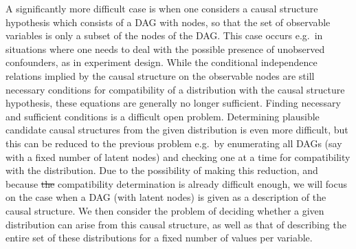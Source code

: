 A significantly more difficult case is when one considers a causal structure hypothesis which consists of a DAG with  nodes, so that the set of observable variables is only a subset of the nodes of the DAG. This case occurs e.g.~in situations where one needs to deal with the possible presence of unobserved confounders, as in experiment design. While the conditional independence relations implied by the causal structure on the observable nodes are still necessary conditions for compatibility of a distribution with the causal structure hypothesis, these equations are generally no longer sufficient. Finding necessary and sufficient conditions is a difficult open problem. Determining plausible candidate causal structures from the given distribution is even more difficult, but this can be reduced to the previous problem e.g.~by enumerating all DAGs (say with a fixed number of latent nodes) and checking one at a time for compatibility with the distribution. Due to the possibility of making this reduction, and because \sout{the} compatibility determination is already difficult enough, we will focus on the case when a DAG (with latent nodes) is given as a description of the causal structure. We then consider the problem of deciding whether a given distribution can arise from this causal structure, as well as that of describing the entire set of these distributions for a fixed number of values per variable.

